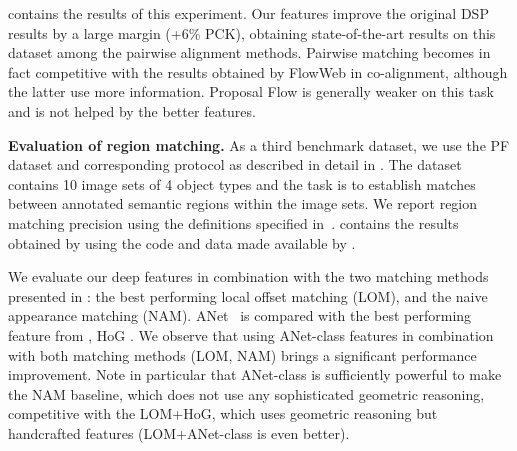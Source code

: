 \documentclass[10pt,twocolumn,letterpaper]{article}
\def\methodname{ANet\xspace}
\newcommand{\myparagraph}[1]{\vspace{0.15cm}\noindent\textbf{#1.}}
\begin{document}
 contains the results of this experiment. Our features improve the original DSP results by a large margin (+6\% PCK), obtaining state-of-the-art results on this dataset among the pairwise alignment methods. Pairwise matching becomes in fact competitive with the results obtained by FlowWeb in co-alignment, although the latter use more information. Proposal Flow is generally weaker on this task and is not helped by the better features. 

\myparagraph{Evaluation of region matching}
As a third benchmark dataset, we use the PF dataset and corresponding protocol as described in detail in \cite{ham2016}. 
The dataset contains 10 image sets of 4 object types and the task is to establish matches between annotated semantic regions within the image sets.
We report region matching precision using the definitions specified in~\cite{ham2016}. 
 contains the results obtained by using the code and data made available by \cite{ham2016}. 

We evaluate our deep features in combination with the two matching methods presented in \cite{ham2016}: the best performing local offset matching (LOM), and the naive appearance matching (NAM). \methodname ~ is compared with the best performing feature from \cite{ham2016}, \ie HoG \cite{hariharan2012discriminative}. We observe that using \methodname-class features %
in combination with both matching methods (LOM, NAM) brings a significant performance improvement.  
Note in particular that \methodname-class is sufficiently powerful to make the NAM baseline, which does not use any sophisticated geometric reasoning, competitive with the LOM+HoG, which uses geometric reasoning but handcrafted features (LOM+\methodname-class is even better).
\end{document}
